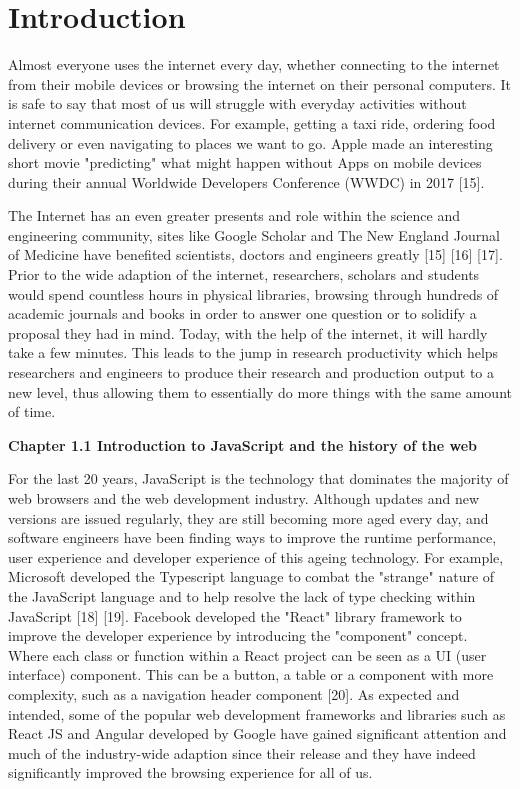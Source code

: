 \chapter{Introduction}

Almost everyone uses the internet every day, whether connecting to the internet from their mobile devices or browsing the internet on their personal computers. It is safe to say that most of us will struggle with everyday activities without internet communication devices. For example, getting a taxi ride, ordering food delivery or even navigating to places we want to go. Apple made an interesting short movie "predicting" what might happen without Apps on mobile devices during their annual Worldwide Developers Conference (WWDC) in 2017 [15].
 
The Internet has an even greater presents and role within the science and engineering community, sites like Google Scholar and The New England Journal of Medicine have benefited scientists, doctors and engineers greatly [15] [16] [17]. Prior to the wide adaption of the internet, researchers, scholars and students would spend countless hours in physical libraries, browsing through hundreds of academic journals and books in order to answer one question or to solidify a proposal they had in mind. Today, with the help of the internet, it will hardly take a few minutes. This leads to the jump in research productivity which helps researchers and engineers to produce their research and production output to a new level, thus allowing them to essentially do more things with the same amount of time.

\bigskip
\textbf{{\Large Chapter 1.1 Introduction to JavaScript and the history of the web}}

For the last 20 years, JavaScript is the technology that dominates the majority of web browsers and the web development industry. Although updates and new versions are issued regularly, they are still becoming more aged every day, and software engineers have been finding ways to improve the runtime performance, user experience and developer experience of this ageing technology. For example, Microsoft developed the Typescript language to combat the "strange" nature of the JavaScript language and to help resolve the lack of type checking within JavaScript [18] [19]. Facebook developed the "React" library framework to improve the developer experience by introducing the "component" concept. Where each class or function within a React project can be seen as a UI (user interface) component. This can be a button, a table or a component with more complexity, such as a navigation header component [20]. As expected and intended, some of the popular web development frameworks and libraries such as React JS and Angular developed by Google have gained significant attention and much of the industry-wide adaption since their release and they have indeed significantly improved the browsing experience for all of us.

